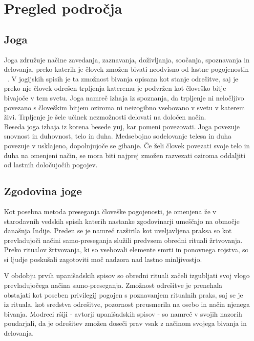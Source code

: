 \documentclass[a4paper, 12pt]{book}
\begin{document}
\chapter{Pregled področja}
\label{ch0}

\section{Joga}
Joga združuje načine zavedanja, zaznavanja, doživljanja, soočanja, spoznavanja in delovanja, preko katerih je človek zmožen bivati neodvisno od lastne pogojenostin ~\cite{oJogi}. V jogijskih spisih je ta zmožnost bivanja opisana kot stanje odrešitve, saj je preko nje človek odrešen trpljenja kateremu je podvržen kot človeško bitje bivajoče v tem svetu. Joga namreč izhaja iz spoznanja, da trpljenje ni neločljivo povezano s človeškim bitjem oziroma ni neizogibno vsebovano v svetu v katerem živi. Trpljenje je šele učinek nezmožnosti delovati na določen način. \\ 

Beseda joga izhaja iz korena besede yuj, kar pomeni povezovati. Joga povezuje snovnost in duhovnost, telo in duha. Medsebojno sodelovanje telesa in duha povezuje v usklajeno, dopolnjujoče se gibanje. Če želi človek povezati svoje telo in duha na omenjeni način, se mora biti najprej zmožen razvezati oziroma oddaljiti od lastnih določujočih pogojev.\\ 

\section{Zgodovina joge}
Kot posebna metoda preseganja človeške pogojenosti, je omenjena že v starodavnih vedskih spisih katerih nastanke zgodovinarji umeščajo na območje današnja Indije. Preden se je namreč razširila kot uveljavljena praksa so kot prevladujoči načini samo-preseganja služili predvsem obredni rituali žrtvovanja. Preko ritualov žrtvovanja, ki so vsebovali elemente smrti in ponovnega rojstva, so si ljudje poskušali zagotoviti moč nadzora nad lastno minljivostjo. 

V obdobju prvih upanišadskih spisov so obredni rituali začeli izgubljati svoj vlogo prevladujočega načina samo-preseganja. Zmožnost odrešitve je prenehala obstajati kot poseben privilegij pogojen s poznavanjem ritualnih praks, saj se je iz rituala, kot sredstva odrešitve, pozornost preusmerila na osebo in način njenega bivanja. Modreci ršiji - avtorji upanišadskih spisov - so namreč v svojih nazorih poudarjali, da je odrešitev zmožen doseči prav vsak z načinom svojega bivanja in delovanja.
\end{document}
